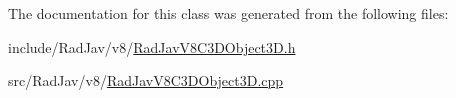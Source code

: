 The documentation for this class was generated from the following files\+:\begin{DoxyCompactItemize}
\item 
include/\+Rad\+Jav/v8/\mbox{\hyperlink{_rad_jav_v8_c3_d_object3_d_8h}{Rad\+Jav\+V8\+C3\+D\+Object3\+D.\+h}}\item 
src/\+Rad\+Jav/v8/\mbox{\hyperlink{_rad_jav_v8_c3_d_object3_d_8cpp}{Rad\+Jav\+V8\+C3\+D\+Object3\+D.\+cpp}}\end{DoxyCompactItemize}
